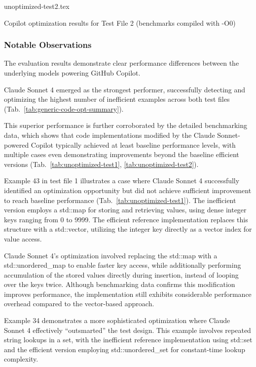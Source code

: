 \begin{table}
  \centering
  {unoptimized-test2.tex}
  \caption{Copilot optimization results for Test File 2 (benchmarks compiled with -O0)}
  \label{tab:unoptimized-test2}
\end{table}

\subsubsection*{Notable Observations}

The evaluation results demonstrate clear performance differences between the underlying models powering GitHub Copilot.

Claude Sonnet 4 emerged as the strongest performer, successfully detecting and optimizing the highest number of inefficient examples across both test files (Tab.\ \ref{tab:generic-code-opt-summary}).

This superior performance is further corroborated by the detailed benchmarking data, which shows that code implementations modified by the Claude Sonnet-powered Copilot typically achieved at least baseline performance levels, with multiple cases even demonstrating improvements beyond the baseline efficient versions (Tab.\ \ref{tab:unoptimized-test1}, \ref{tab:unoptimized-test2}).

\vspace{\baselineskip}
Example 43 in test file 1 illustrates a case where Claude Sonnet 4 successfully identified an optimization opportunity but did not achieve sufficient improvement to reach baseline performance (Tab.\ \ref{tab:unoptimized-test1}).
The inefficient version employs a std::map for storing and retrieving values, using dense integer keys ranging from 0 to 9999.
The efficient reference implementation replaces this structure with a std::vector, utilizing the integer key directly as a vector index for value access.

Claude Sonnet 4's optimization involved replacing the std::map with a std::unordered\_map to enable faster key access, while additionally performing accumulation of the stored values directly during insertion, instead of looping over the keys twice.
Although benchmarking data confirms this modification improves performance, the implementation still exhibits considerable performance overhead compared to the vector-based approach.

\vspace{\baselineskip}
Example 34 demonstrates a more sophisticated optimization where Claude Sonnet 4 effectively \enquote{outsmarted} the test design.
This example involves repeated string lookups in a set, with the inefficient reference implementation using std::set and the efficient version employing std::unordered\_set for constant-time lookup complexity.

